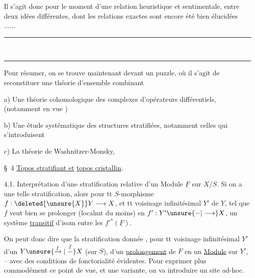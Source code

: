 Il s'agit donc pour le moment d'une relation heuristique et sentimentale, entre deux idées différentes, dont les relations exactes sont   encore  été bien élucidées ......

\begin{center}
\rule{.27\linewidth}{.4pt}\\[-.6ex]
\rule{.22\linewidth}{.4pt}
\end{center}

Pour résumer, on se trouve maintenant devant un puzzle, où il s'agit de reconstituer une théorie d'ensemble   combinant

a) Une théorie cohomologique des complexes d'opérateurs différentiels,  (notamment en vue )

b) Une étude systématique des structures stratifiées, notamment  celles qui s'introduisent

c) La théorie de Washnitzer-Monsky,

\S~4 \uline{Topos stratifiant et} \uline{topos cristallin}.

4.1. Interprétation d'une stratification relative d'un Module $\underline F$ sur $X/S$. Si on a une telle stratification, alors pour tt $S$-morphisme $f:\deleted{\unsure{X}}Y\longrightarrow X$, et tt voisinage infinitésimal $Y'$ de $Y$,   tel que $f$ veut bien se prolonger (localmt du moins) en $f':Y'\unsure{\mathbin{-}|\longrightarrow}X$, un système \uline{transitif} d'isom entre les $f'{}^*(\underline F)$.

On peut donc dire que la   stratification   donnée  , pour tt voisinage infinitésimal $Y'$ d'un $Y\unsure{\xrightarrow{f}|\mathrel{\overset f{-}}}X$ (sur $S$),  d'un \uline{prolongement}  de $F$ en un \uline{Module} sur $Y'$, -- avec des conditions de fonctorialité évidentes. Pour exprimer plus commodément ce point de vue, et une variante, on va introduire un site ad-hoc.

